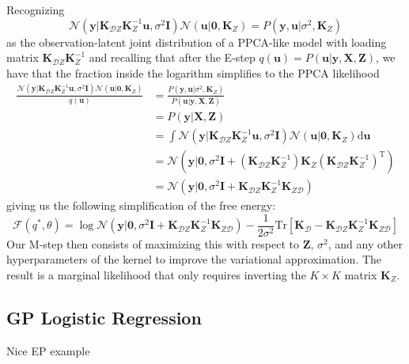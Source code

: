 \documentclass[a4paper]{article}
\begin{document}
Recognizing 
\[ \mathcal{N}(\mathbf{y}|\mathbf{K}_{\mathcal{D}Z}\mathbf{K}_Z^{-1}\mathbf{u},\sigma^2 \mathbf{I}) \mathcal{N}(\mathbf{u}|\mathbf{0},\mathbf{K}_Z) = P(\mathbf{y},\mathbf{u}|\sigma^2,\mathbf{K}_Z) \]
as the observation-latent joint distribution of a PPCA-like model with loading matrix $\mathbf{K}_{\mathcal{D}Z}\mathbf{K}_Z^{-1}$ and recalling that after the E-step $q(\mathbf{u}) = P(\mathbf{u}|\mathbf{y,X,Z})$, we have that the fraction inside the logarithm simplifies to the PPCA likelihood
\begin{align*}
\frac{\mathcal{N}(\mathbf{y}|\mathbf{K}_{\mathcal{D}Z}\mathbf{K}_Z^{-1}\mathbf{u},\sigma^2 \mathbf{I}) \mathcal{N}(\mathbf{u}|\mathbf{0},\mathbf{K}_Z)}{q(\mathbf{u})} &= \frac{P(\mathbf{y},\mathbf{u}|\sigma^2,\mathbf{K}_Z)}{P(\mathbf{u}|\mathbf{y,X,Z})} \\
&= P(\mathbf{y}|\mathbf{X,Z}) \\
&= \int \mathcal{N}(\mathbf{y}|\mathbf{K}_{\mathcal{D}Z}\mathbf{K}_Z^{-1}\mathbf{u},\sigma^2 \mathbf{I}) \mathcal{N}(\mathbf{u}|\mathbf{0},\mathbf{K}_Z) \textrm{d}\mathbf{u} \\
&= \mathcal{N}\left(\mathbf{y}| \mathbf{0}, \sigma^2 \mathbf{I} + (\mathbf{K}_{\mathcal{D}Z}\mathbf{K}_Z^{-1})\mathbf{K}_Z(\mathbf{K}_{\mathcal{D}Z}\mathbf{K}_Z^{-1})^\textrm{T} \right) \\
&= \mathcal{N}\left(\mathbf{y}| \mathbf{0}, \sigma^2 \mathbf{I} + \mathbf{K}_{\mathcal{D}Z}\mathbf{K}_Z^{-1}\mathbf{K}_{Z\mathcal{D}} \right)
\end{align*}
giving us the following simplification of the free energy:
\[ \mathcal{F}(q^*,\theta) = \log\mathcal{N}\left(\mathbf{y}| \mathbf{0}, \sigma^2 \mathbf{I} + \mathbf{K}_{\mathcal{D}Z}\mathbf{K}_Z^{-1}\mathbf{K}_{Z\mathcal{D}} \right) - \frac{1}{2\sigma^2}\textrm{Tr}\left[\mathbf{K}_\mathcal{D} - \mathbf{K}_{\mathcal{D}Z}\mathbf{K}_Z^{-1}\mathbf{K}_{Z\mathcal{D}}\right] \]
Our M-step then consists of maximizing this with respect to $\mathbf{Z}$, $\sigma^2$, and any other hyperparameters of the kernel to improve the variational approximation. The result is a marginal likelihood that only requires inverting the $K\times K$ matrix $\mathbf{K}_Z$.

\subsection{GP Logistic Regression}
Nice EP example
\end{document}
